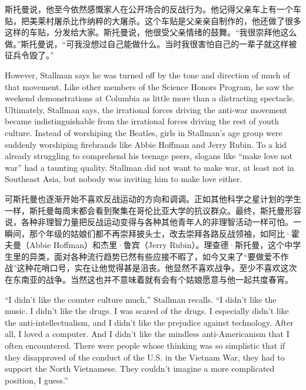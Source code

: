 \ifdefined\chs
斯托曼说，他至今依然感慨家人在公开场合的反战行为。他记得父亲车上有一个车贴，把美莱村屠杀比作纳粹的大屠杀。这个车贴是父亲亲自制作的，他还做了很多这样的车贴，分发给大家。斯托曼说，他很受父亲情绪的鼓舞。``我很崇拜他这么做。''斯托曼说，``可我没想过自己能做什么。当时我很害怕自己的一辈子就这样被征兵令毁了。''
\fi

\ifdefined\eng
However, Stallman says he was turned off by the tone and direction of much of that movement. Like other members of the Science Honors Program, he saw the weekend demonstrations at Columbia as little more than a distracting spectacle. Ultimately, Stallman says, the irrational forces driving the anti-war movement became indistinguishable from the irrational forces driving the rest of youth culture. Instead of worshiping the Beatles, girls in Stallman's age group were suddenly worshiping firebrands like Abbie Hoffman and Jerry Rubin. To a kid already struggling to comprehend his teenage peers, slogans like ``make love not war'' had a taunting quality. Stallman did not want to make war, at least not in Southeast Asia, but nobody was inviting him to make love either.
\fi

\ifdefined\chs
可斯托曼也逐渐开始不喜欢反战运动的方向和调调。正如其他科学之星计划的学生一样，斯托曼每周末都会看到聚集在哥伦比亚大学的抗议群众。最终，斯托曼形容说，各种非理智力量把反战运动变得与各种其他青年人的非理智活动一样可怕。一瞬间，那个年级的姑娘们都不再崇拜披头士，改去崇拜各路反战领袖，如阿比·霍夫曼（Abbie
Hoffman）和杰里·鲁宾（Jerry Rubin）。理查德·斯托曼，这个中学生里的异类，面对各种流行趋势已然有些应接不暇了，如今又来了``要做爱不作战''这种花哨口号，实在让他觉得甚是沮丧。他显然不喜欢战争，至少不喜欢这次在东南亚的战争。当然这也并不意味着就有会有个姑娘愿意与他一起共度春宵。
\fi

\ifdefined\eng
``I didn't like the counter culture much,'' Stallman recalls. ``I didn't like the music. I didn't like the drugs. I was scared of the drugs. I especially didn't like the anti-intellectualism, and I didn't like the prejudice against technology. After all, I loved a computer. And I didn't like the mindless anti-Americanism that I often encountered. There were people whose thinking was so simplistic that if they disapproved of the conduct of the U.S. in the Vietnam War, they had to support the North Vietnamese. They couldn't imagine a more complicated position, I guess.''
\fi

